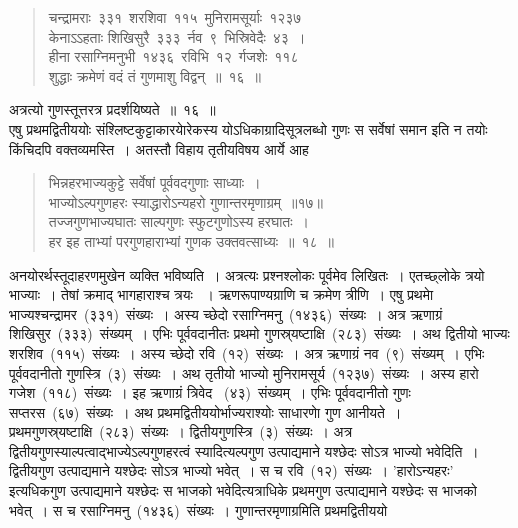\documentclass[11pt, openany]{book}
\begin{document}
\newpage
\thispagestyle{fancy}
\fancyhf{}
\begin{quote}
{\ku चन्द्रामराः~३३१~शरशिवा~११५~मुनिरामसूर्याः~१२३७\\
केनाऽऽहताः शिखिसुरै~३३३~र्नव~९~भिस्रिवेदैः~४३~।\\
हीना रसाग्निमनुभी~१४३६~रविभि~१२~र्गजशेः~११८\\
शुद्धाः क्रमेणं वदं तं गुणमाशु विद्वन्~॥~१६~॥}
\end{quote}
\indent
अत्रत्यो गुणस्तूत्तरत्र प्रदर्शयिष्यते~॥~१६~॥\\
\indent
एषु प्रथमद्वितीययोः संश्लिष्टकुट्टाकारयाेरेकस्य योऽधिकाग्रादिसूत्रलब्धो गुणः स सर्वेषां समान इति न तयोः किंचिदपि वक्तव्यमस्ति~। अतस्तौ विहाय तृतीयविषय आर्ये आह\textendash
\begin{quote}
{\ks भिन्नहरभाज्यकुट्टे सर्वेषां पूर्ववदगुणाः साध्याः~।\\
भाज्योऽल्पगुणहरः स्याद्धारोऽन्यहरो गुणान्तरमृणाग्रम्~॥१७॥\\
तज्जगुणभाज्यघातः साल्पगुणः स्फुटगुणोऽस्य हरघातः~।\\
हर इह ताभ्यां परगुणहाराभ्यां गुणक उक्तवत्साध्यः~॥~१८~॥}
\end{quote}
\indent
अनयोरर्थस्तूदाहरणमुखेन व्यक्ति भविष्यति~। अत्रत्यः प्रश्नश्लोकः पूर्वमेव लिखितः~। एतच्छ्लोके त्रयो भाज्याः~। तेषां क्रमाद् भागहाराश्च त्रयः ~। ऋणरूपाण्यग्राणि च क्रमेण त्रीणि~। एषु प्रथमाे भाज्यश्चन्द्रामर~(३३१)~संख्यः~। अस्य च्छेदो रसाग्निमनु~(१४३६)~संख्यः~। अत्र ऋणाग्रं शिखिसुर~(३३३)~संख्यम्~। एभिः पूर्ववदानीतः प्रथमो गुणस्र्यष्टाक्षि~(२८३)~संख्यः~। अथ द्वितीयो भाज्यः शरशिव~(११५)~संख्यः~। अस्य च्छेदो रवि~(१२)~संख्यः~। अत्र ऋणाग्रं नव~(९)~संख्यम्~। एभिः पूर्ववदानीतो गुणस्त्रि~(३)~संख्यः~। अथ तृतीयो भाज्यो मुनिरामसूर्य~(१२३७)~संख्यः~। अस्य हारो गजेश~(११८)~संख्यः~। इह ऋणाग्रं त्रिवेद ~(४३)~संख्यम्~। एभिः पूर्ववदानीतो गुणः सप्तरस~(६७)~संख्यः~। अथ प्रथमद्वितीययोर्भाज्यराश्योः  साधारणाे गुण आनीयते~। प्रथमगुणस्र्यष्टाक्षि~(२८३)~संख्यः~। द्वितीयगुणस्त्रि~(३)~संख्यः~। अत्र द्वितीयगुणस्याल्पत्वाद्भाज्येऽल्पगुणहरत्वं स्यादित्यल्पगुण उत्पाद्यमाने यश्छेदः सोऽत्र भाज्यो भवेदिति~। द्वितीयगुण उत्पाद्यमाने यश्छेदः सोऽत्र भाज्यो भवेत्~। स च रवि~(१२)~संख्यः~। 'हारोऽन्यहरः' इत्यधिकगुण उत्पाद्यमाने यश्छेदः स भाजको भवेदित्यत्राधिके प्रथमगुण उत्पाद्यमाने यश्छेदः स भाजको भवेत्~। स च रसाग्निमनु~(१४३६)~संख्यः~। गुणान्तरमृणाग्रमिति प्रथमद्वितीययो\textendash
\end{document}
